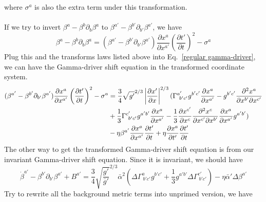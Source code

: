 \documentclass{article}
\begin{document}
where $\sigma^{a}$ is also the extra term under this transformation.\\
\\ 
If we try to invert $\beta^{a} - \beta^{b}\partial_{b}\beta^{a}$ to $\beta^{a'} - \beta^{b'}\partial_{b'}\beta^{a'}$, we have
\[
\beta^{a} - \beta^{b}\partial_{b}\beta^{a} = (\beta^{a'} - \beta^{b'}\partial_{b'}\beta^{a'})\frac{\partial x^{a}}{\partial x^{a'}}\left(\frac{\partial t'}{\partial t}\right)^{2} - \sigma^{a}
\]
Plug this and the transforms laws listed above into Eq.~\ref{regular gamma-driver}, we can have the Gamma-driver shift equation in the transformed coordinate system. 
\begin{align}\label{transformed gamma-driver}
(\beta^{a'} - \beta^{b'}\partial_{b'}\beta^{a'})\frac{\partial x^{a}}{\partial x^{a'}}\left(\frac{\partial t'}{\partial t}\right)^{2} - \sigma^{a} & = \frac{3}{4}\sqrt{g'}^{2/3}\left|\frac{\partial x'}{\partial x}\right|^{2/3}(\Gamma^{a'}_{~b'c'}g^{b'c'}\frac{\partial x^{a}}{\partial x^{a'}} - g^{b'c'}\frac{\partial^{2} x^{a}}{\partial x^{b'}\partial x^{c'}}\notag\\
& + \frac{1}{3}\Gamma^{c'}_{~b'c'}g^{a'b'}\frac{\partial x^{a}}{\partial x^{a'}} - \frac{1}{3}\frac{\partial x^{c'}}{\partial x^{c}}\frac{\partial^{2} x^{c}}{\partial x^{c'}\partial x^{b'}}\frac{\partial x^{a}}{\partial x^{a'}}g^{a'b'})\notag\\
& - \eta \beta^{a'}\frac{\partial x^{a}}{\partial x^{a'}}\frac{\partial t'}{\partial t} + \eta \frac{\partial x^{a}}{\partial t'}\frac{\partial t'}{\partial t}
\end{align}
The other way to get the transformed Gamma-driver shift equation is from our invariant Gamma-driver shift equation. Since it is invariant, we should have
\[
{\dot \beta}^{a'} - \beta^{b'}\partial_{b'}\beta^{a'} + B^{a'} = \frac{3}{4}\sqrt{\frac{g'}{{\bar g}'}}^{2/3}{\bar \alpha}^{2}(\Delta \Gamma^{a}_{~b'c'}g^{b'c'} + \frac{1}{3}g^{a'b'}\Delta\Gamma^{c'}_{~b'c'}) - \eta {\bar \alpha}'\Delta\beta^{a'}
\]
Try to rewrite all the background metric terms into unprimed version, we have
\end{document}
